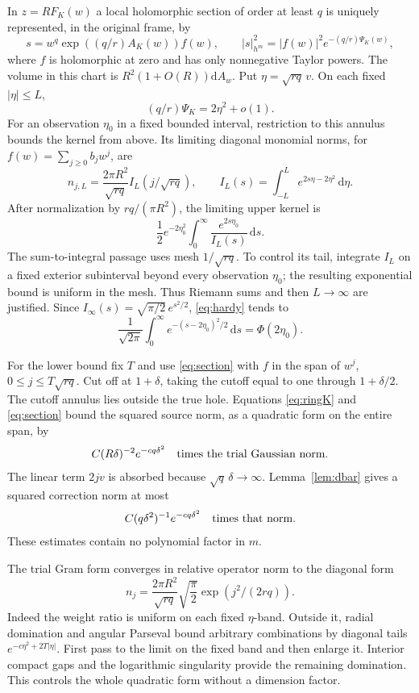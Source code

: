 \documentclass[11pt]{article}
\theoremstyle{remark}\newtheorem{remark}[theorem]{Remark}
\newcommand{\dA}{\mathrm dA}
\newcommand{\PhiG}{\Phi}
\begin{document}
In $z=RF_K(w)$ a local holomorphic section of order at least $q$ is
uniquely represented, in the original frame, by
\begin{equation}\label{eq:section}
 s=w^q\exp((q/r)A_K(w))f(w),\qquad
 |s|_{h^m}^2=|f(w)|^2e^{-(q/r)\Psi_K(w)},
\end{equation}
where $f$ is holomorphic at zero and has only nonnegative Taylor powers.
The volume in this chart is $R^2(1+O(R))\dA_w$. Put
$\eta=\sqrt{rq}\,v$. On each fixed $|\eta|\leq L$,
\[
 (q/r)\Psi_K=2\eta^2+o(1).
\]
For an observation $\eta_0$ in a fixed bounded interval, restriction to
this annulus bounds the kernel from above. Its limiting diagonal
monomial norms, for $f(w)=\sum_{j\geq0}b_jw^j$, are
\[
 n_{j,L}=\frac{2\pi R^2}{\sqrt{rq}}I_L(j/\sqrt{rq}),\qquad
 I_L(s)=\int_{-L}^L e^{2s\eta-2\eta^2}\,\mathrm d\eta.
\]
After normalization by $rq/(\pi R^2)$, the limiting upper kernel is
\begin{equation}\label{eq:hardy}
 \frac12e^{-2\eta_0^2}\int_0^\infty\frac{e^{2s\eta_0}}{I_L(s)}\,\mathrm ds.
\end{equation}
The sum-to-integral passage uses mesh $1/\sqrt{rq}$. To control its tail,
integrate $I_L$ on a fixed exterior subinterval beyond every observation
$\eta_0$; the resulting exponential bound is uniform in the mesh.
Thus Riemann sums and then $L\to\infty$ are justified. Since
$I_\infty(s)=\sqrt{\pi/2}\,e^{s^2/2}$, \eqref{eq:hardy} tends to
\begin{equation}\label{eq:gaussian}
 \frac1{\sqrt{2\pi}}\int_0^\infty e^{-(s-2\eta_0)^2/2}\,\mathrm ds
 =\PhiG(2\eta_0).
\end{equation}

For the lower bound fix $T$ and use \eqref{eq:section} with
$f$ in the span of $w^j$, $0\leq j\leq T\sqrt{rq}$. Cut off at
$1+\delta$, taking the cutoff equal to one through $1+\delta/2$.
The cutoff annulus lies outside the true hole. Equations
\eqref{eq:ringK} and \eqref{eq:section} bound the squared source norm,
as a quadratic form on the entire span, by
\[
 C(R\delta)^{-2}e^{-cq\delta^2}
 \quad\hbox{times the trial Gaussian norm}.
\]
The linear term $2jv$ is absorbed because $\sqrt q\,\delta\to\infty$.
Lemma~\ref{lem:dbar} gives a squared correction norm at most
\begin{equation}\label{eq:smallcorr}
 C(q\delta^2)^{-1}e^{-cq\delta^2}
 \quad\hbox{times that norm}.
\end{equation}
These estimates contain no polynomial factor in $m$.

The trial Gram form converges in relative operator norm to the diagonal
form
\begin{equation}\label{eq:gram}
 n_j=\frac{2\pi R^2}{\sqrt{rq}}\sqrt{\frac\pi2}
          \exp(j^2/(2rq)).
\end{equation}
Indeed the weight ratio is uniform on each fixed $\eta$-band. Outside
it, radial domination and angular Parseval bound arbitrary combinations
by diagonal tails $e^{-c\eta^2+2T|\eta|}$. First pass to the limit on
the fixed band and then enlarge it. Interior compact gaps and the
logarithmic singularity provide the remaining domination. This controls
the whole quadratic form without a dimension factor.
\end{document}
